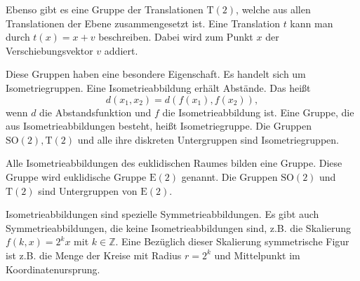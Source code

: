 \documentclass[a4paper,10pt,fleqn,twocolumn,twoside]{article}
\begin{document}
Ebenso gibt es eine Gruppe der Translationen \(\mathrm T(2)\), welche aus allen Translationen der Ebene zusammengesetzt ist. Eine Translation \(t\) kann man durch \(t(x)=x+v\) beschreiben. Dabei wird zum Punkt \(x\) der Verschiebungsvektor \(v\) addiert.

Diese Gruppen haben eine besondere Eigenschaft. Es handelt sich um Isometriegruppen. Eine Isometrieabbildung erhält Abstände. Das heißt
\[d(x_1,x_2)=d(f(x_1),f(x_2)),\]
wenn \(d\) die Abstandsfunktion und \(f\) die Isometrieabbildung ist. Eine Gruppe, die aus Isometrieabbildungen besteht, heißt Isometriegruppe.
Die Gruppen \(\mathrm{SO}(2), \mathrm T(2)\) und alle ihre diskreten
Untergruppen sind Isometriegruppen.

Alle Isometrieabbildungen des euklidischen Raumes bilden eine Gruppe.
Diese Gruppe wird euklidische Gruppe \(\mathrm E(2)\) genannt.
Die Gruppen \(\mathrm{SO}(2)\) und \(\mathrm T(2)\) sind Untergruppen
von \(\mathrm E(2)\).

Isometrieabbildungen sind spezielle Symmetrieabbildungen.
Es gibt auch Symmetrieabbildungen, die keine Isometrieabbildungen sind,
z.B. die Skalierung \(f(k,x) = 2^k x\) mit \(k\in\mathbb Z\).
Eine Bezüglich dieser Skalierung symmetrische Figur ist z.B. die
Menge der Kreise mit Radius \(r=2^k\) und Mittelpunkt im
Koordinatenursprung.
\end{document}
